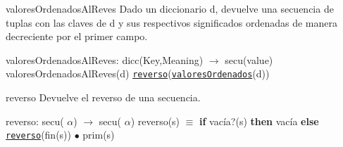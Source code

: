 \begin{DoxyParagraph}{valores\+Ordenados\+Al\+Reves}
Dado un diccionario d, devuelve una secuencia de tuplas con las claves de d y sus respectivos significados ordenadas de manera decreciente por el primer campo.

valores\+Ordenados\+Al\+Reves\+: dicc(\+Key,\+Meaning) $\to$ secu(value) ~\newline
valores\+Ordenados\+Al\+Reves(d) \href{axiomas.html#reverso}{\tt reverso}(\href{axiomas.html#valoresOrdenados}{\tt valores\+Ordenados}(d))


\end{DoxyParagraph}
\begin{DoxyParagraph}{reverso}
Devuelve el reverso de una secuencia.

reverso\+: secu( $\alpha$) $\to$ secu( $\alpha$) reverso(s) $\equiv$ {\bfseries if} vacía?(s) {\bfseries then} vacía {\bfseries else} \href{axiomas.html#reverso}{\tt reverso}(fin(s)) $\bullet$ prim(s) 
\end{DoxyParagraph}
